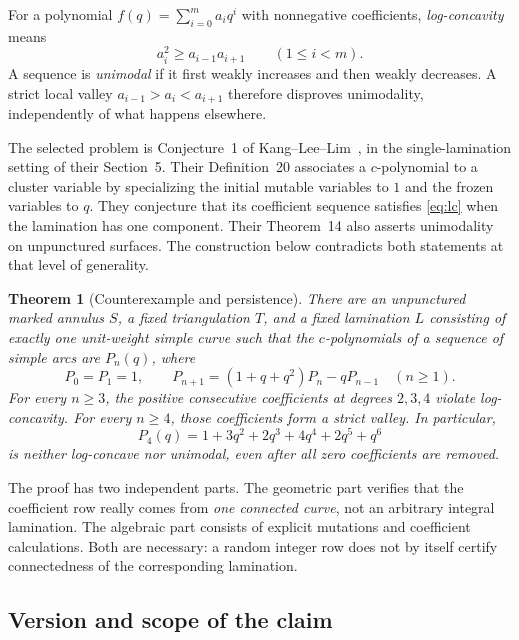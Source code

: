 \documentclass[11pt,letterpaper]{article}
\numberwithin{equation}{section}
\newtheorem{theorem}{Theorem}[section]
\theoremstyle{definition}
\begin{document}
For a polynomial $f(q)=\sum_{i=0}^{m}a_iq^i$ with nonnegative coefficients,
\emph{log-concavity} means
\begin{equation}\label{eq:lc}
 a_i^2\geq a_{i-1}a_{i+1}\qquad(1\leq i<m).
\end{equation}
A sequence is \emph{unimodal} if it first weakly increases and then weakly
decreases. A strict local valley $a_{i-1}>a_i<a_{i+1}$ therefore disproves
unimodality, independently of what happens elsewhere.

The selected problem is Conjecture~1 of Kang--Lee--Lim~\cite{KLL}, in the
single-lamination setting of their Section~5. Their Definition~20 associates a
$c$-polynomial to a cluster variable by specializing the initial mutable
variables to $1$ and the frozen variables to $q$. They conjecture that its
coefficient sequence satisfies \eqref{eq:lc} when the lamination has one
component. Their Theorem~14 also asserts unimodality on unpunctured surfaces.
The construction below contradicts both statements at that level of generality.

\begin{theorem}[Counterexample and persistence]\label{thm:main}
There are an unpunctured marked annulus $S$, a fixed triangulation $T$, and a
fixed lamination $L$ consisting of exactly one unit-weight simple curve such
that the $c$-polynomials of a sequence of simple arcs are $P_n(q)$, where
\begin{equation}\label{eq:mainlinear}
 P_0=P_1=1,\qquad
 P_{n+1}=(1+q+q^2)P_n-qP_{n-1}\quad(n\geq1).
\end{equation}
For every $n\geq3$, the positive consecutive coefficients at degrees $2,3,4$
violate log-concavity. For every $n\geq4$, those coefficients form a strict
valley. In particular,
\begin{equation}\label{eq:P4}
 P_4(q)=1+3q^2+2q^3+4q^4+2q^5+q^6
\end{equation}
is neither log-concave nor unimodal, even after all zero coefficients are
removed.
\end{theorem}

The proof has two independent parts. The geometric part verifies that the
coefficient row really comes from \emph{one connected curve}, not an arbitrary
integral lamination. The algebraic part consists of explicit mutations and
coefficient calculations. Both are necessary: a random integer row does not
by itself certify connectedness of the corresponding lamination.

\subsection{Version and scope of the claim}
\end{document}
